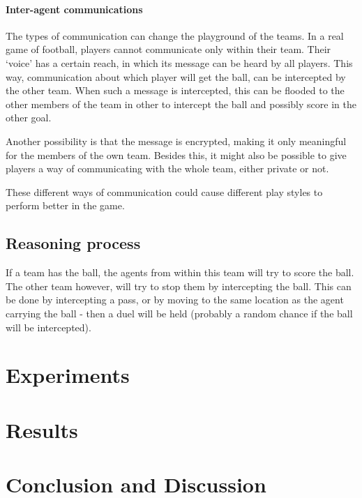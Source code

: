 \documentclass{article}
\begin{document}
\paragraph{Inter-agent communications}
The types of communication can change the playground of the teams. In a real game of football, players cannot communicate only within their team. Their `voice' has a certain reach, in which its message can be heard by all players. This way, communication about which player will get the ball, can be intercepted by the other team. When such a message is intercepted, this can be flooded to the other members of the team in other to intercept the ball and possibly score in the other goal.

Another possibility is that the message is encrypted, making it only meaningful for the members of the own team. Besides this, it might also be possible to give players a way of communicating with the whole team, either private or not.

These different ways of communication could cause different play styles to perform better in the game.
\subsection{Reasoning process}
If a team has the ball, the agents from within this team will try to score the ball. The other team however, will try to stop them by intercepting the ball. This can be done by intercepting a pass, or by moving to the same location as the agent carrying the ball - then a duel will be held (probably a random chance if the ball will be intercepted).

\section{Experiments}

\section{Results}

\section{Conclusion and Discussion}
\end{document}
